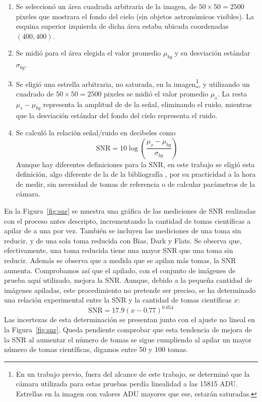 \documentclass[a4paper, 12pt]{article}
\begin{document}
\begin{enumerate}
\item Se seleccionó un área cuadrada arbitraria de la imagen, de $50\times50=2500$ pixeles que mostrara el fondo del cielo (sin objetos astronómicos visibles). La esquina superior izquierda de dicha área estaba ubicada coordenadas $(400,400)$.
\item Se midió para el área elegida el valor promedio $\mu_{bg}$ y su desviación estándar $\sigma_{bg}$.
\item Se eligió una estrella arbitraria, no saturada, en la imagen\footnote{En un trabajo previo, fuera del alcance de este trabajo, se determinó que la cámara utilizada para estas pruebas perdía linealidad a las 15815 ADU. Estrellas en la imagen con valores ADU mayores que ese, estarán saturadas.}, y utilizando un cuadrado de  $50\times50=2500$ pixeles se midió el valor promedio $\mu_s$. La resta $\mu_s - \mu_{bg}$ representa la amplitud de de la señal, eliminando el ruido, mientras que la desviación estándar del fondo del cielo representa el ruido.
\item Se calculó la relación señal/ruido en decibeles como $$\mbox{SNR}=10 \log{\left(\frac{\mu_s - \mu_{bg}}{\sigma_{bg}}\right)}$$ Aunque hay diferentes definiciones para la SNR, en este trabajo se eligió esta definición, algo diferente de la de la bibliografía \cite{easton, romanishin}, por su practicidad a la hora de medir, sin necesidad de tomas de referencia o de calcular parámetros de la cámara.
\end{enumerate}

En la Figura~\ref{fig:snr} se muestra una gráfica de las mediciones de SNR realizadas con el proceso antes descripto, incrementando la cantidad de tomas científicas a apilar de a una por vez. También se incluyen las mediciones de una toma sin reducir, y de una sola toma reducida con Bias, Dark y Flats. Se observa que, efectivamente, una toma reducida tiene una mayor SNR que una toma sin reducir. Además se observa que a medida que se apilan más tomas, la SNR aumenta. Comprobamos así que el apilado, con el conjunto de imágenes de prueba aquí utilizado, mejora la SNR.  Aunque, debido a la pequeña cantidad de imágenes apiladas, este procedimiento no pretende ser preciso, se ha determinado una relación experimental entre la SNR y la cantidad de tomas científicas $x$: $$\mbox{SNR}=17.9(x-0.77)^{0.054}$$ Las incertezas de esta determinación se presentan junto con el ajuste no lineal en la Figura~\ref{fig:snr}. Queda pendiente comprobar que esta tendencia de mejora de la SNR al aumentar el número de tomas se sigue cumpliendo al apilar un mayor número de tomas científicas, digamos entre 50 y 100 tomas.
\end{document}
